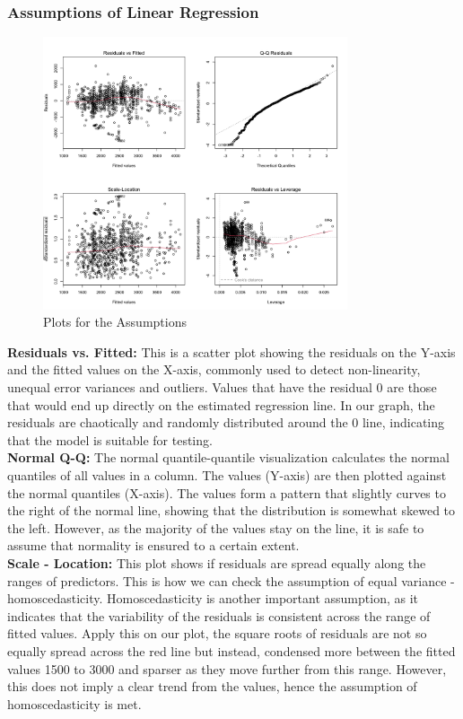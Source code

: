 \subsubsection{Assumptions of Linear Regression}

\begin{figure}[H]
    \centering
    \includegraphics[width=0.8\textwidth]{graphics/assumption_new.png}
    \caption{Plots for the Assumptions}
\end{figure}

\textbf{Residuals vs. Fitted:} This is a scatter plot showing the residuals on the Y-axis and the fitted values on the X-axis, commonly used to detect non-linearity, unequal error variances and outliers. Values that have the residual 0 are those that would end up directly on the estimated regression line. In our graph, the residuals are chaotically and randomly distributed around the 0 line, indicating that the model is suitable for testing. \\

\textbf{Normal Q-Q:} The normal quantile-quantile visualization calculates the normal quantiles of all values in a column. The values (Y-axis) are then plotted against the normal quantiles (X-axis). The values form a pattern that slightly curves to the right of the normal line, showing that the distribution is somewhat skewed to the left. However, as the majority of the values stay on the line, it is safe to assume that normality is ensured to a certain extent. \\

\textbf{Scale - Location:} This plot shows if residuals are spread equally along the ranges of predictors. This is how we can check the assumption of equal variance - homoscedasticity. Homoscedasticity is another important assumption, as it indicates that the variability of the residuals is consistent across the range of fitted values. Apply this on our plot, the square roots of residuals are not so equally spread across the red line but instead, condensed more between the fitted values 1500 to 3000 and sparser as they move further from this range. However, this does not imply a clear trend from the values, hence the assumption of homoscedasticity is met.\\

